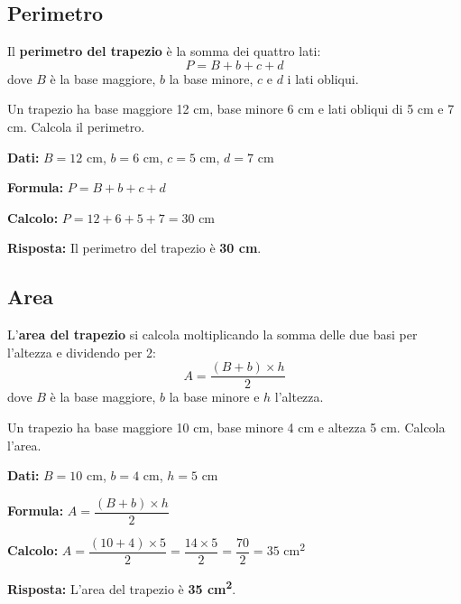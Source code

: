 \subsection{Perimetro}

\begin{regola}
    Il \textbf{perimetro del trapezio} è la somma dei quattro lati:
    \[
        P = B + b + c + d
    \]
    dove $B$ è la base maggiore, $b$ la base minore, $c$ e $d$ i lati obliqui.
\end{regola}

\begin{esempio}
    Un trapezio ha base maggiore 12 cm, base minore 6 cm e lati obliqui di 5 cm e 7 cm. Calcola il perimetro.

    \medskip
    \textbf{Dati:} $B = 12$ cm, $b = 6$ cm, $c = 5$ cm, $d = 7$ cm

    \textbf{Formula:} $P = B + b + c + d$

    \textbf{Calcolo:} $P = 12 + 6 + 5 + 7 = 30$ cm

    \textbf{Risposta:} Il perimetro del trapezio è \textbf{30 cm}.
\end{esempio}

\subsection{Area}

\begin{regola}
    L'\textbf{area del trapezio} si calcola moltiplicando la somma delle due basi per l'altezza e dividendo per 2:
    \[
        A = \frac{(B + b) \times h}{2}
    \]
    dove $B$ è la base maggiore, $b$ la base minore e $h$ l'altezza.
\end{regola}

\begin{esempio}
    Un trapezio ha base maggiore 10 cm, base minore 4 cm e altezza 5 cm. Calcola l'area.

    \medskip
    \textbf{Dati:} $B = 10$ cm, $b = 4$ cm, $h = 5$ cm

    \textbf{Formula:} $A = \dfrac{(B + b) \times h}{2}$

    \textbf{Calcolo:} $A = \dfrac{(10 + 4) \times 5}{2} = \dfrac{14 \times 5}{2} = \dfrac{70}{2} = 35$ cm\textsuperscript{2}

    \textbf{Risposta:} L'area del trapezio è \textbf{35 cm\textsuperscript{2}}.
\end{esempio}

